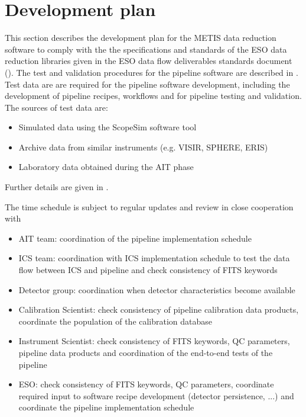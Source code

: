 \clearpage
\section{Development plan}\label{sec:development_plan}

This section describes the development plan for the METIS data reduction software to comply with the the specifications and standards of the ESO data reduction libraries given in the ESO data flow deliverables standards document (\cite{1618}). The test and validation procedures for the pipeline software are described in \cite{DRLVT}. 
Test data are are required for the pipeline software development, including the development of pipeline recipes, workflows and for pipeline testing and validation. The sources of test data are:
\begin{itemize}
    \item Simulated data using the ScopeSim software tool
    \item Archive data from similar instruments (e.g. \ac{VISIR}, SPHERE, ERIS)
    \item Laboratory data obtained during the \ac{AIT} phase
\end{itemize}
Further details are given in \cite{DRLVT}.

The time schedule is subject to regular updates and review in close cooperation with

\begin{itemize}
    \item \ac{AIT} team: coordination of the pipeline implementation schedule
    \item \ac{ICS} team: coordination with ICS implementation schedule to test the data flow between ICS and pipeline and check consistency of FITS keywords
    \item Detector group: coordination when detector characteristics become available
    \item Calibration Scientist: check consistency of pipeline calibration data products, coordinate the population of the calibration database
    \item Instrument Scientist: check consistency of FITS keywords, QC parameters, pipeline data products and coordination of the end-to-end tests of the pipeline
    \item ESO: check consistency of FITS keywords, QC parameters, coordinate required input to software recipe development (detector persistence, ...) and coordinate the pipeline implementation schedule
\end{itemize}

